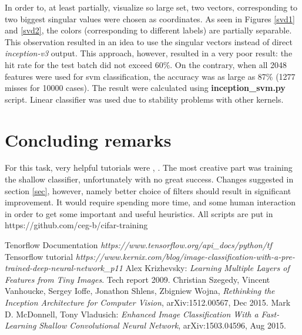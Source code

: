 \documentclass{article}
\begin{document}
In order to, at least partially, visualize so large set, two vectors,
corresponding to two biggest singular values were chosen as coordinates.
As seen in Figures \ref{svd1} and \ref{svd2}, the colors (corresponding
to different labels) are partially separable. This observation
resulted in an idea to use the singular vectors instead
of direct {\it inception-v3} output. This approach, however,
resulted in a very poor result: the hit rate for the test batch
did not exceed  60\%. On the contrary, when all 2048
features were used for svm classification, the accuracy
was as large as 87\% (1277 misses for 10000 cases). The result were calculated using 
{\bf inception\_svm.py} script. Linear classifier was used due to stability
problems with other kernels.

\section{Concluding remarks}

For this task, very helpful tutorials were \cite{tf}, \cite{tfsvm}.
The most creative part was training the shallow classifier,
unfortunately with no great success. Changes suggested
in section \ref{sec}, however, namely better choice of filters
should result in significant improvement. It would require
spending more time, and some human interaction
in order to get some important and useful heuristics.
All scripts are put in
{\sc https://github.com/ceg-b/cifar-training}




%
%

\begin{thebibliography}{1}

 Tenorflow Documentation {\em https://www.tensorflow.org/api\_docs/python/tf}
 Tensorflow tutorial {\em https://www.kernix.com/blog/image-classification-with-a-pre-trained-deep-neural-network\_p11}
 Alex Krizhevsky: {\em Learning Multiple Layers of Features from Tiny Images}. Tech report 2009.
 Christian Szegedy, Vincent Vanhoucke, Sergey Ioffe, Jonathon Shlens, Zbigniew Wojna, {\em Rethinking the Inception Architecture for Computer Vision},  arXiv:1512.00567, Dec 2015.
 Mark D. McDonnell, Tony Vladusich: {\em Enhanced Image Classification With a Fast-Learning Shallow Convolutional Neural Network},  	arXiv:1503.04596, Aug 2015.
  

\end{thebibliography}
\end{document}
